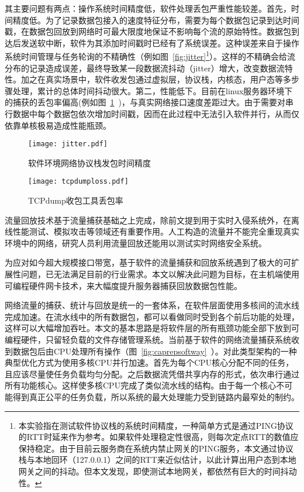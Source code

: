 其主要问题有两点：操作系统时间精度低，软件处理丢包严重性能较差。首先，时间精度低。为了记录数据包接入的速度特征分布，需要为每个数据包记录到达时间戳，在数据包回放到网络时可最大限度地保证不影响每个流的原始特性。数据包到达后发送软中断，软件为其添加时间戳时已经有了系统误差。这种误差来自于操作系统时间管理与任务轮询的不精确性（例如图~\ref{fig:jitter}\footnote{本实验指在测试软件协议栈的系统时间精度，一种简单方式是通过PING协议的RTT时延来作为参考。如果软件处理稳定性很高，则每次定点RTT的数值应保持稳定。由于目前云服务商在系统内禁止网关的PING服务，本文通过协议栈与本地回环（127.0.0.1）之间的RTT来近似估计，以此计算出用户态到本地网关之间的抖动。但本文发现，即使测试本地网关，都依然有巨大的时间抖动性。}）。这样的不精确会给流分布的记录造成误差，最终导致某一段数据流抖动（jitter）增大，改变数据流特性。加之在真实场景中，软件收发包通过虚拟层，协议栈，内核态，用户态等多步骤处理，累计的总体时间抖动很大。第二，性能低下。目前在linux服务器环境下的捕获的丢包率偏高(例如图~\ref{fig:tcpdumploss}~)，与真实网络接口速度差距过大。由于需要对串行数据中每个数据包依次增加时间戳，因而在此过程中无法引入软件并行，从而仅依靠单核极易造成性能瓶颈。



\begin{figure}[htbp]
	\centering 
	\vspace{-1.5mm}
	\begin{minipage}[t]{0.48\textwidth}
		\centering
		\texttt{[image: jitter.pdf]}
		\caption{软件环境网络协议栈发包时间精度} \label{fig:jitter}
	\end{minipage}
	\begin{minipage}[t]{0.48\textwidth}
		\centering
		\texttt{[image: tcpdumploss.pdf]}
		\caption{TCPdump收包工具丢包率} \label{fig:tcpdumploss}
	\end{minipage}
\end{figure}

流量回放技术基于流量捕获基础之上完成，除前文提到用于实时入侵系统外，在离线性能测试、模拟攻击等领域还有重要作用。人工构造的流量并不能完全重现真实环境中的网络，研究人员利用流量回放还能用以测试实时网络安全系统。

为应对如今超大规模接口带宽，基于软件的流量捕获和回放系统遇到了极大的可扩展性问题，已无法满足目前的行业需求。本文以解决此问题为目标，在主机端使用可编程硬件网卡技术，来大幅度提升服务器捕获回放数据包性能。




网络流量的捕获、统计与回放是统一的一套体系，在软件层面使用多核间的流水线完成加速。在流水线中的所有数据包，都可以看做同时受到各个前后功能的处理，这样可以大幅增加吞吐。本文的基本思路是将软件层的所有瓶颈功能全部下放到可编程硬件，只留轻负载的文件存储管理系统。当前基于软件的网络流量捕获系统收到数据包后由CPU处理所有操作（图~\ref{fig:caprepsoftway}~）。对此类型架构的一种典型优化方式为使用多核CPU并行加速。首先为每个CPU核心分配不同的任务，且应该尽量使任务负载均匀分配。之后数据流凭借共享内存的形式，依次串行通过所有功能核心。这样使多核CPU完成了类似流水线的结构。由于每一个核心不可能得到真正公平的任务负载，所以系统的最大处理能力受到链路内最窄处的制约。



